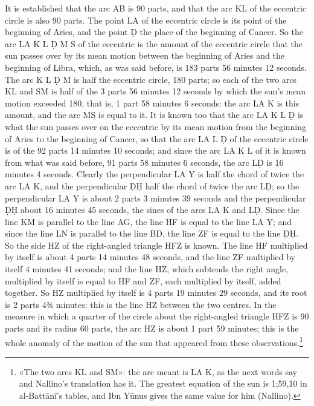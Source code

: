 \documentclass[11pt]{article}
\newcommand{\ArPage}[1]{\marginpar{\footnotesize\color{gray}Ar.\,p.\,#1}}
\begin{document}
\par \ArPage{66}It is established that the arc AB is 90 parts, and that the arc KL of the eccentric circle is also 90 parts. The point LA of the eccentric circle is its point of the beginning of Aries, and the point Ḍ the place of the beginning of Cancer. So the arc LA K L Ḍ M S of the eccentric is the amount of the eccentric circle that the sun passes over by its mean motion between the beginning of Aries and the beginning of Libra, which, as was said before, is 183 parts 56 minutes 12 seconds. The arc K L Ḍ M is half the eccentric circle, 180 parts; so each of the two arcs KL and SM is half of the 3 parts 56 minutes 12 seconds by which the sun's mean motion exceeded 180, that is, 1 part 58 minutes 6 seconds: the arc LA K is this amount, and the arc MS is equal to it. It is known too that the arc LA K L Ḍ is what the sun passes over on the eccentric by its mean motion from the beginning of Aries to the beginning of Cancer, so that the arc LA L Ḍ of the eccentric circle is of the 92 parts 14 minutes 10 seconds; and since the arc LA K L of it is known from what was said before, 91 parts 58 minutes 6 seconds, the arc LḌ is 16 minutes 4 seconds. Clearly the perpendicular LA Y is half the chord of twice the arc LA K, and the perpendicular ḌḤ half the chord of twice the arc LḌ; so the perpendicular LA Y is about 2 parts 3 minutes 39 seconds and the perpendicular ḌḤ about 16 minutes 45 seconds, the sines of the arcs LA K and LḌ. Since the line KM is parallel to the line AG, the line HF is equal to the line LA Y; and since the line LN is parallel to the line BD, the line ZF is equal to the line ḌḤ. So the side HZ of the right-angled triangle HFZ is known. The line HF multiplied by itself is about 4 parts 14 minutes 48 seconds, and the line ZF multiplied by itself 4 minutes 41 seconds; and the line HZ, which subtends the right angle, multiplied by itself is equal to HF and ZF, each multiplied by itself, added together. So HZ multiplied by itself is 4 parts 19 minutes 29 seconds, and its root is 2 parts 4¾ minutes: this is the line HZ between the two centres. In the measure in which a quarter of the circle about the right-angled triangle HFZ is 90 parts and its radius 60 parts, the arc HZ is about 1 part 59 minutes; this is the whole anomaly of the motion of the sun that appeared from these observations.\footnote{«The two arcs KL and SM»: the arc meant is LA K, as the next words say and Nallino's translation has it. The greatest equation of the sun is 1;59,10 in al-Battānī's tables, and Ibn Yūnus gives the same value for him (Nallino).}\par
\end{document}
